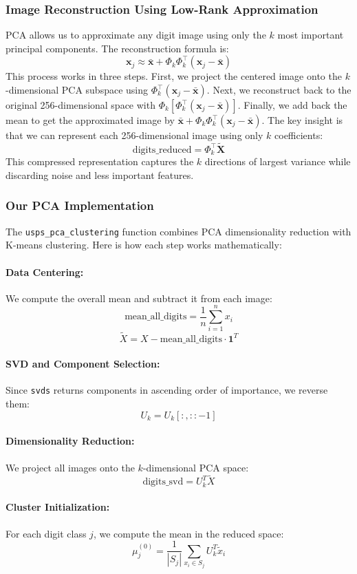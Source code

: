 \documentclass{article}
\begin{document}
\subsubsection{Image Reconstruction Using Low-Rank Approximation}
PCA allows us to approximate any digit image using only the $k$ most important principal components. The reconstruction formula is:
\[
\mathbf{x}_j \approx \bar{\mathbf{x}} + \Phi_k \Phi_k^\top (\mathbf{x}_j - \bar{\mathbf{x}})
\]
This process works in three steps. First, we project the centered image onto the $k$-dimensional PCA subspace using $\Phi_k^\top (\mathbf{x}_j - \bar{\mathbf{x}})$. Next, we reconstruct back to the original 256-dimensional space with $\Phi_k \left[\Phi_k^\top (\mathbf{x}_j - \bar{\mathbf{x}})\right]$. Finally, we add back the mean to get the approximated image by $\bar{\mathbf{x}} + \Phi_k \Phi_k^\top (\mathbf{x}_j - \bar{\mathbf{x}})$. The key insight is that we can represent each 256-dimensional image using only $k$ coefficients:
\[
\text{digits\_reduced} = \Phi_k^\top \tilde{\mathbf{X}}
\]
This compressed representation captures the $k$ directions of largest variance while discarding noise and less important features.

\subsubsection{Our PCA Implementation}
The \texttt{usps\_pca\_clustering} function combines PCA dimensionality reduction with K-means clustering. Here is how each step works mathematically:
\paragraph{Data Centering:}
We compute the overall mean and subtract it from each image: $$\text{mean\_all\_digits} = \frac{1}{n} \sum_{i=1}^n x_i$$ $$\tilde{X} = X - \text{mean\_all\_digits} \cdot \mathbf{1}^T$$
\paragraph{SVD and Component Selection:} Since \texttt{svds} returns components in ascending order of importance, we reverse them: $$U_k = U_k[:,::-1]$$
\paragraph{Dimensionality Reduction:} We project all images onto the $k$-dimensional PCA space: $$\text{digits\_svd} = U_k^T\tilde{X}$$
\paragraph{Cluster Initialization:} For each digit class $j$, we compute the mean in the reduced space: $$\mu_j^{(0)} = \frac{1}{|S_j|} \sum_{x_i \in S_j} U_k^T\tilde{x}_i$$
\end{document}
